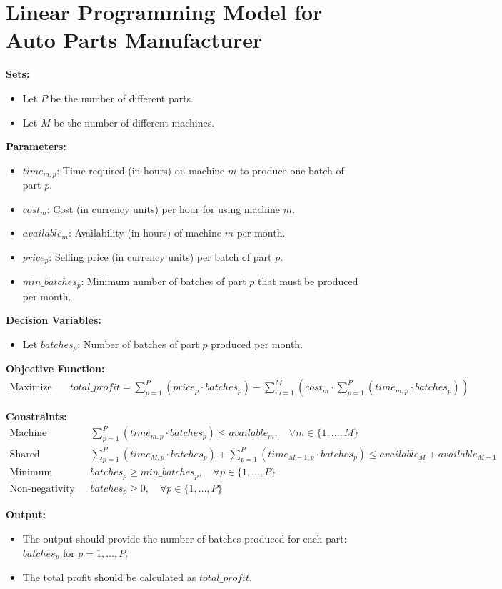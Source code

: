 \documentclass{article}
\begin{document}
\section*{Linear Programming Model for Auto Parts Manufacturer}

\textbf{Sets:}
\begin{itemize}
    \item Let $P$ be the number of different parts.
    \item Let $M$ be the number of different machines.
\end{itemize}

\textbf{Parameters:}
\begin{itemize}
    \item $time_{m,p}$: Time required (in hours) on machine $m$ to produce one batch of part $p$.
    \item $cost_m$: Cost (in currency units) per hour for using machine $m$.
    \item $available_m$: Availability (in hours) of machine $m$ per month.
    \item $price_p$: Selling price (in currency units) per batch of part $p$.
    \item $min\_batches_p$: Minimum number of batches of part $p$ that must be produced per month.
\end{itemize}

\textbf{Decision Variables:}
\begin{itemize}
    \item Let $batches_p$: Number of batches of part $p$ produced per month.
\end{itemize}

\textbf{Objective Function:}
\begin{align*}
    \text{Maximize} \quad & total\_profit = \sum_{p=1}^{P} (price_p \cdot batches_p) - \sum_{m=1}^{M} (cost_m \cdot \sum_{p=1}^{P} (time_{m,p} \cdot batches_p))
\end{align*}

\textbf{Constraints:}
\begin{align*}
    \text{Machine Availability Constraints:} \quad & \sum_{p=1}^{P} (time_{m,p} \cdot batches_p) \leq available_m, \quad \forall m \in \{1, \ldots, M\} \\
    \text{Shared Availability for M and M-1:} \quad & \sum_{p=1}^{P} (time_{M,p} \cdot batches_p) + \sum_{p=1}^{P} (time_{M-1,p} \cdot batches_p) \leq available_M + available_{M-1} \\
    \text{Minimum Production Requirements:} \quad & batches_p \geq min\_batches_p, \quad \forall p \in \{1, \ldots, P\} \\
    \text{Non-negativity Constraints:} \quad & batches_p \geq 0, \quad \forall p \in \{1, \ldots, P\}
\end{align*}

\textbf{Output:}
\begin{itemize}
    \item The output should provide the number of batches produced for each part: $batches_p$ for $p = 1, \ldots, P$.
    \item The total profit should be calculated as $total\_profit$.
\end{itemize}
\end{document}
